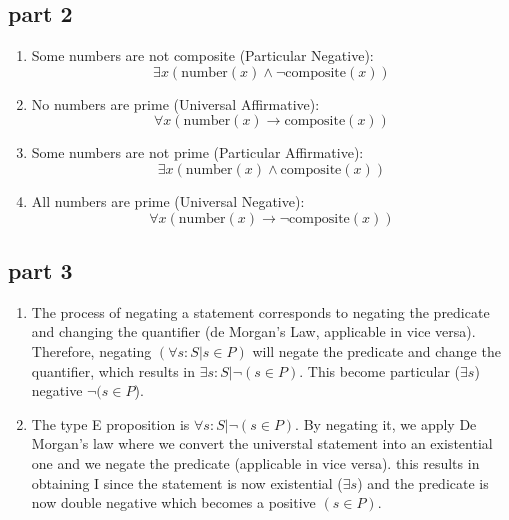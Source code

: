 \documentclass[12pt]{article}
\begin{document}
	\subsection*{part 2}
	\begin{enumerate}
		\item Some numbers are not composite (Particular Negative):
		\[ \exists x (\text{number}(x) \land \neg \text{composite}(x)) \]
		
		\item No numbers are prime (Universal Affirmative):
		\[ \forall x (\text{number}(x) \rightarrow \text{composite}(x)) \]
		
		\item Some numbers are not prime (Particular Affirmative):
		\[ \exists x (\text{number}(x) \land \text{composite}(x)) \]
		
		\item All numbers are prime (Universal Negative):
		\[ \forall x (\text{number}(x) \rightarrow \neg \text{composite}(x)) \]
	\end{enumerate}

	\subsection*{part 3}
	\begin{enumerate}
		\item The process of negating a statement corresponds to negating the predicate and changing the quantifier (de Morgan's Law, applicable in vice versa).
		Therefore, negating $(\forall s: S| s \in P)$ will negate the predicate and change the quantifier, which results in 
		$\exists s : S | \neg(s \in P)$. This become particular ($\exists s$) negative $\neg(s \in P$).
		\item The type E proposition is $\forall s : S |\neg(s \in P)$. By negating it, we apply De Morgan's law where we convert the
		universtal statement into an existential one and we negate the predicate (applicable in vice versa). this results in obtaining I since the statement is 
		now existential ($\exists s$) and the predicate is now double negative which becomes a positive $(s \in P)$. 
	\end{enumerate}
\end{document}
